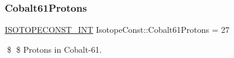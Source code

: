 \subsubsection{\texorpdfstring{Cobalt61\+Protons}{Cobalt61Protons}}
{\footnotesize\ttfamily \mbox{\hyperlink{group___isotope_const-_macros_ga5f18360b3e99483a35c32d789e62621c}{I\+S\+O\+T\+O\+P\+E\+C\+O\+N\+S\+T\+\_\+\+I\+NT}} Isotope\+Const\+::\+Cobalt61\+Protons = 27}

\$ \$ Protons in Cobalt-\/61. 